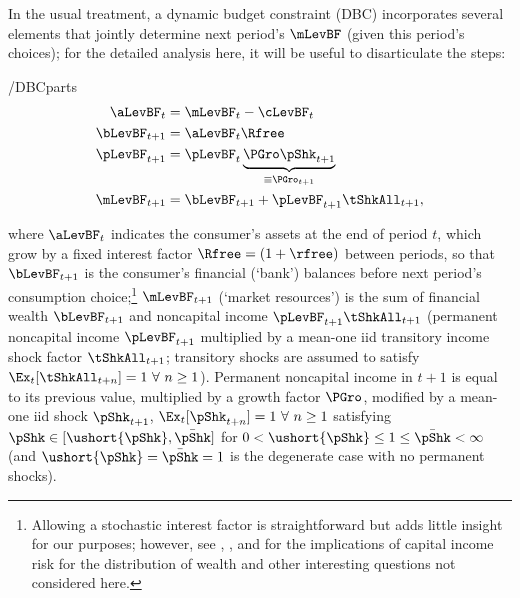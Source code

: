 \documentclass[BufferStockTheory]{subfiles}
\providecommand{\LtxDir}{LaTeX/}
\begin{document}
In the usual treatment, a dynamic budget constraint (DBC) incorporates
several elements that jointly determine next period's $\mLevBF$ (given this
period's choices); for the detailed analysis here, it will be useful to
disarticulate the steps:\hypertarget{DBCParts}{}
\begin{verbatimwrite}{\EqDir/DBCparts}
  \begin{align}
    \aLevBF_{t}    & = \mLevBF_{t}-\cLevBF_{t}  \label{eq:DBCparts} \\
    \bLevBF_{t+1}    & = \aLevBF_{t} \Rfree \notag \\
    \pLevBF_{t+1}  & = \pLevBF_{t} \underbrace{\PGro\pShk_{t+1}}_{\equiv \PGro_{t+1}}  \notag \\
    \mLevBF_{t+1}  & =  \bLevBF_{t+1} +\pLevBF_{t+1}\tShkAll_{t+1},  \notag
  \end{align}
\end{verbatimwrite}
 where $\aLevBF_{t}$ indicates the consumer's assets at the end of period $t$, which grow by a fixed interest factor $\Rfree =(1+\rfree)$ between periods,  so that $\bLevBF_{t+1}$ is the consumer's financial (`bank') balances before next period's consumption choice;\footnote{Allowing a stochastic interest factor is straightforward but adds little insight for our purposes; however, see \cite{benhabibWealth}, \cite{maTodaRich}, and \cite{mstIncFluct} for the implications of capital income risk for the distribution of wealth and other interesting questions not considered here.} $\mLevBF_{t+1}$ (`market resources') is the sum of financial wealth $\bLevBF_{t+1}$ and noncapital income $\pLevBF_{t+1}\tShkAll_{t+1}$ (permanent noncapital income $\pLevBF_{t+1}$ multiplied by a mean-one iid transitory income shock factor $\tShkAll_{t+1}$; transitory shocks are assumed to satisfy $\Ex_{t}[{\tShkAll}_{t+n}]=1~\forall~n\geq 1$). Permanent noncapital income in $t+1$ is equal to its previous value, multiplied by a growth factor $\PGro$, modified by a mean-one iid shock $\pShk_{t+1}$, $\Ex_{t}[{\pShk}_{t+n}]=1~\forall~n \geq 1$ satisfying $\pShk \in [\ushort{\pShk},\bar{\pShk}]$ for $0 < \ushort{\pShk} \leq 1 \leq \bar{\pShk} < \infty$ (and $\ushort{\pShk}=\bar{\pShk}=1$ is the degenerate case with no permanent shocks).
\end{document}
